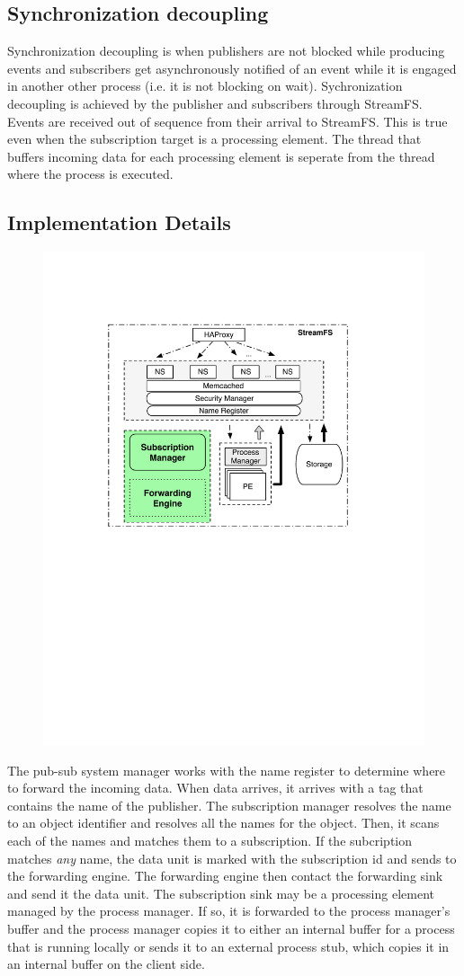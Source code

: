 \subsection{Synchronization decoupling}
Synchronization decoupling is when publishers are not blocked while producing events and subscribers get asynchronously notified
of an event while it is engaged in another other process (i.e. it is not blocking on wait).
Sychronization decoupling is achieved by the publisher and subscribers through StreamFS.  Events are received out of sequence
from their arrival to StreamFS.  This is true even when the subscription target is a processing element.  The thread that buffers
incoming data for each processing element is seperate from the thread where the process is executed.



\subsection{Implementation Details}

\begin{figure}[h!] %
\centering
\includegraphics[width=.55\columnwidth]{figs/submngr}
\caption{}
\label{fig:submngr}
\end{figure}

The pub-sub system manager works with the name register to determine where to forward the incoming data.  When data arrives, it arrives
with a tag that contains the name of the publisher.  The subscription manager resolves the name to an object identifier and resolves
all the names for the object.  Then, it scans each of the names and matches them to a subscription.  If the subcription matches \emph{any}
name, the data unit is marked with the subscription id and sends to the forwarding engine.  The forwarding engine then
contact the forwarding sink and send it the data unit.  The subscription sink may be a processing element managed by the process manager.
If so, it is forwarded to the process manager's buffer and the process manager copies it to either an internal buffer for a
process that is running locally or sends it to an external process stub, which copies it in an internal buffer on the client side.
